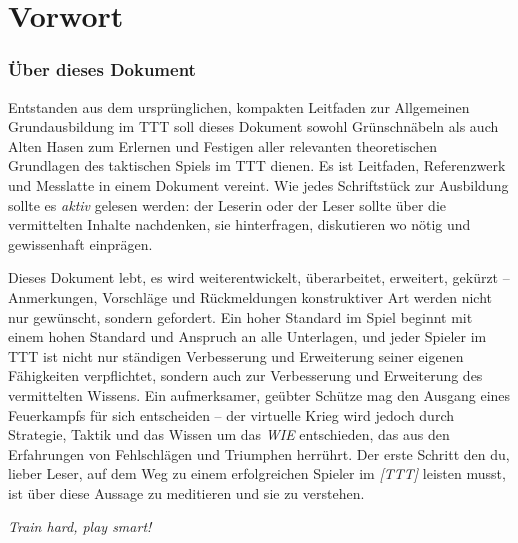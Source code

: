 \chapter*{Vorwort}
\subsection*{Über dieses Dokument}
Entstanden aus dem ursprünglichen, kompakten Leitfaden zur Allgemeinen Grundausbildung im \ac{TTT} soll dieses Dokument sowohl Grünschnäbeln als auch Alten Hasen zum Erlernen und Festigen aller relevanten theoretischen Grundlagen des taktischen Spiels im \ac{TTT} dienen. 
Es ist Leitfaden, Referenzwerk und Messlatte in einem Dokument vereint. 
Wie jedes Schriftstück zur Ausbildung sollte es \textit{aktiv} gelesen werden: der Leserin oder der Leser sollte über die vermittelten Inhalte nachdenken, sie hinterfragen, diskutieren wo nötig und gewissenhaft einprägen.\par
Dieses Dokument lebt, es wird weiterentwickelt, überarbeitet, erweitert, gekürzt -- Anmerkungen, Vorschläge und Rückmeldungen konstruktiver Art werden nicht nur gewünscht, sondern gefordert. Ein hoher Standard im Spiel beginnt mit einem hohen Standard und Anspruch an alle Unterlagen, und jeder Spieler im \ac{TTT} ist nicht nur ständigen Verbesserung und Erweiterung seiner eigenen Fähigkeiten verpflichtet, sondern auch zur Verbesserung und Erweiterung des vermittelten Wissens.
Ein aufmerksamer, geübter Schütze mag den Ausgang eines Feuerkampfs für sich entscheiden -- der virtuelle Krieg wird jedoch durch Strategie, Taktik und das Wissen um das \textit{WIE} entschieden, das aus den Erfahrungen von Fehlschlägen und Triumphen herrührt. Der erste Schritt den du, lieber Leser, auf dem Weg zu einem erfolgreichen Spieler im \emph{[\ac{TTT}]} leisten musst, ist über diese Aussage zu meditieren und sie zu verstehen.
\par\bigskip
\textit{Train hard, play smart!}


\clearpage
